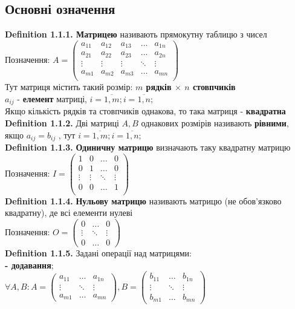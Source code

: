 \documentclass[a4paper, 14pt]{extarticle}
\def\defin#1{\textbf{Definition {#1}}}
\def\bigline{\vspace{5mm}\\}
\begin{document}
    	\subsection{Основні означення}
    	\defin{1.1.1. Матрицею} називають прямокутну таблицю з чисел\\
    	Позначення: $A = \begin{pmatrix}
    	a_{11} & a_{12} & a_{13} & \dots & a_{1n} \\
    	a_{21} & a_{22} & a_{23} & \dots & a_{2n} \\
    	\vdots & \vdots & \vdots & \ddots & \vdots\\
    	a_{m1} & a_{m2} & a_{m3} & \dots & a_{mn} \\
    	\end{pmatrix}$\\
    	Тут матриця містить такий розмір: \textbf{$m$ рядків $\times$ $n$ стовпчиків}\\
    	$a_{ij}$ - \textbf{елемент} матриці, $i=\overline{1,m}; i=\overline{1,n};$
    	\bigline
    	Якщо кількість рядків та стовпчиків однакова, то така матриця - \textbf{квадратна}
    	\bigline
    	\defin{1.1.2.} Дві матриці $A,B$ однакових розмірів називають \textbf{рівними}, якщо $a_{ij} = b_{ij}$ , тут $i=\overline{1,m}; i=\overline{1,n};$\bigline
    	\defin{1.1.3.} \textbf{Одиничну матрицю} визначають таку квадратну матрицю\\
    	Позначення: $I = \begin{pmatrix}
    	1 & 0 & \dots & 0 \\
    	0 & 1 & \dots & 0 \\
    	\vdots & \vdots & \ddots & \vdots \\
    	0 & 0 & \dots & 1 \\
    	\end{pmatrix}$
    	\bigline
    	\defin{1.1.4.} \textbf{Нульову матрицю} називають матрицю (не обов'язково квадратну), де всі елементи нулеві\\
    	Позначення: $O = \begin{pmatrix}
    	0 & \dots & 0 \\
    	\vdots & \ddots & \vdots \\
    	0 & \dots & 0
    	\end{pmatrix}$
    	\bigline
    	\defin{1.1.5.} Задані операції над матрицями:\\
    	\textbf{- додавання};\\
    	$\forall A,B: A = \begin{pmatrix}
    	a_{11} & \dots & a_{1n} \\
    	\vdots & \ddots & \vdots \\
    	a_{m1} & \dots & a_{mn}
    	\end{pmatrix}, B = \begin{pmatrix}
    	b_{11} & \dots & b_{1n} \\
    	\vdots & \ddots & \vdots \\
    	b_{m1} & \dots & b_{mn}
    	\end{pmatrix}$\\
\end{document}
